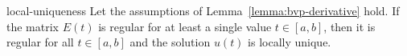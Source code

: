 \begin{Theorem}{local-uniqueness}
    Let the
  assumptions of Lemma~\ref{lemma:bvp-derivative} hold. If the matrix $E(t)$ is
  regular for at least a single value $t\in [a,b]$, then it is regular
  for all $t\in [a,b]$ and the solution $u(t)$ is locally unique.
\end{Theorem}
